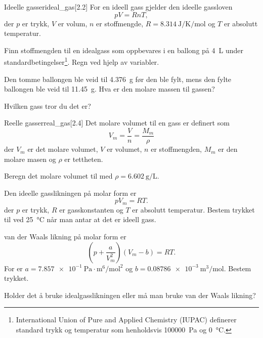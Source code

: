 \begin{exercise}{Ideelle gasser}{ideal_gas}[2.2]
	For en ideell gass gjelder den ideelle gassloven
	\begin{equation*}
		pV=RnT,
	\end{equation*}
	der $p$ er trykk, $V$ er volum, $n$ er stoffmengde, $R=\SI{8.314}{\joule\per\kelvin\per\mole}$ og $T$ er absolutt temperatur. 
	
	\subexercise Finn stoffmengden til en idealgass som oppbevares i en ballong på \SI{4}{\liter} under standardbetingelser\footnote{International Union of Pure and Applied Chemistry (IUPAC) definerer standard trykk og temperatur som henholdsvis \SI{100000}{\pascal} og \SI{0}{\celsius}.}. Regn ved hjelp av variabler.
	
	\subexercise Den tomme ballongen ble veid til \SI{4,376}{\gram} før den ble fylt, mens den fylte ballongen ble veid til \SI{11,45}{\gram}. Hva er den molare massen til gassen?
	
	\subexercise Hvilken gass tror du det er?
\end{exercise}

\begin{exercise}{Reelle gasser}{real_gas}[2.4]
	Det molare volumet til en gass er definert som
	\begin{equation*}
		V_m=\frac Vn=\frac{ M_m}{\rho}
	\end{equation*}
	der $V_m$ er det molare volumet, $V$ er volumet, $n$ er stoffmengden, $M_m$ er den molare masen og $\rho$ er tettheten.
	
	\subexercise Beregn det molare volumet til  med $\rho=\SI{6,602}{\gram\per\liter}$.
	
	\subexercise Den ideelle gasslikningen på molar form er
	\begin{equation*}
		pV_m = RT.
	\end{equation*}
	der $p$ er trykk, $R$ er gasskonstanten og $T$ er absolutt temperatur. Bestem trykket til  ved \SI{25}{\celsius} når man antar at det er ideell gass.
	
	\subexercise van der Waals likning på molar form er
	\begin{equation*}
		\left( p+\frac{a}{V_m^2}\right) \left( V_m-b\right) =RT.
	\end{equation*}
	For  er $a=\SI{7,857e-1}{\pascal\cdot\meter^6\per\mole\squared}$ og  $b=\SI{0,08786e-3}{\meter\cubed\per\mole}$. Bestem trykket.
	
	\subexercise Holder det å bruke idealgasslikningen eller må man bruke van der Waals likning?
\end{exercise}

